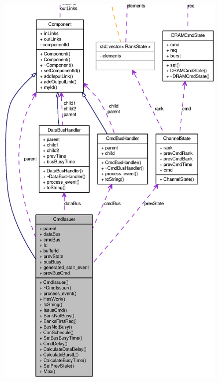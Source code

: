 \begin{figure}[H]
\begin{center}
\leavevmode
\includegraphics[width=400pt]{classCmdIssuer__coll__graph}
\end{center}
\end{figure}

